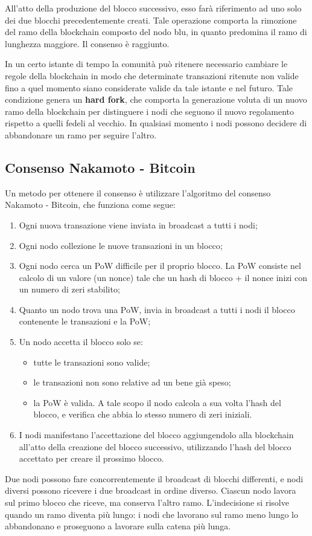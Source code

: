 All'atto della produzione del blocco successivo, esso farà riferimento ad uno solo dei due blocchi precedentemente creati. Tale operazione comporta la rimozione del ramo della blockchain composto del nodo blu, in quanto predomina il ramo di lunghezza maggiore. Il consenso è raggiunto.

In un certo istante di tempo la comunità può ritenere necessario cambiare le regole della blockchain in modo che determinate transazioni ritenute non valide fino a quel momento siano considerate valide da tale istante e nel futuro. Tale condizione genera un \textbf{hard fork}, che comporta la generazione voluta di un nuovo ramo della blockchain per distinguere i nodi che seguono il nuovo regolamento rispetto a quelli fedeli al vecchio. In qualsiasi momento i nodi possono decidere di abbandonare un ramo per seguire l'altro.

\subsection{Consenso Nakamoto - Bitcoin}
Un metodo per ottenere il consenso è utilizzare l'algoritmo del consenso Nakamoto - Bitcoin, che funziona come segue:
\begin{enumerate}
    \item Ogni nuova transazione viene inviata in broadcast a tutti i nodi;
    \item Ogni nodo collezione le nuove transazioni in un blocco;
    \item Ogni nodo cerca un PoW difficile per il proprio blocco. La PoW consiste nel calcolo di un valore (un nonce) tale che un hash di blocco + il nonce inizi con un numero di zeri stabilito;
    \item Quanto un nodo trova una PoW, invia in broadcast a tutti i nodi il blocco contenente le transazioni e la PoW;
    \item Un nodo accetta il blocco solo se:
    \begin{itemize}
        \item tutte le transazioni sono valide;
        \item le transazioni non sono relative ad un bene già speso;
        \item la PoW è valida. A tale scopo il nodo calcola a sua volta l'hash del blocco, e verifica che abbia lo stesso numero di zeri iniziali.
    \end{itemize}
    \item I nodi manifestano l'accettazione del blocco aggiungendolo alla blockchain all'atto della creazione del blocco successivo, utilizzando l'hash del blocco accettato per creare il prossimo blocco.
\end{enumerate}
Due nodi possono fare concorrentemente il broadcast di blocchi differenti, e nodi diversi possono ricevere i due broadcast in ordine diverso. Ciascun nodo lavora sul primo blocco che riceve, ma conserva l'altro ramo. L'indecisione si risolve quando un ramo diventa più lungo: i nodi che lavorano sul ramo meno lungo lo abbandonano e proseguono a lavorare sulla catena più lunga.

